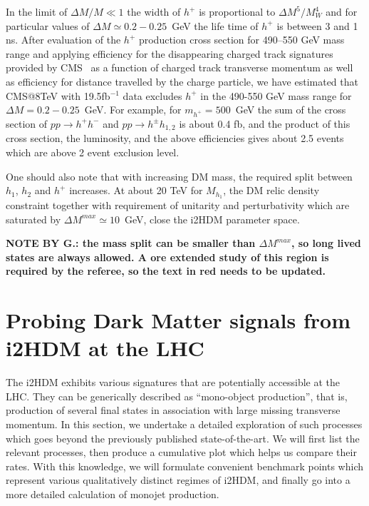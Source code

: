 \documentclass[12pt,a4paper]{article}
\newcommand {\red} {\color{red}}
\begin{document}
{\red In the limit of $\Delta M/M\ll 1$ the width of  $h^+$ is proportional to  $\Delta M^5/M_W^4$
and for particular values of $\Delta M\simeq 0.2-0.25$~GeV the  life time of  $h^+$ is between 3 and 1 ns.
After evaluation of the  $h^+$ production cross section for  490--550 GeV mass range
and applying efficiency for the  disappearing charged track signatures provided by  CMS~\cite{CMS:2014gxa}
as a function of charged track transverse momentum as well as efficiency for distance travelled by the charge particle,
we have estimated  that CMS@8TeV with 19.5fb$^{-1}$ data excludes  $h^+$  in the 490-550 GeV mass range for   $\Delta M=0.2-0.25$~GeV.
For example, for $m_{h^+}=500$~GeV the sum of the cross section of $pp\to{h^+}{h^-}$ and  $pp\to{h^\pm}{h_{1,2}}$
is about 0.4 fb, and the product of this cross section, the luminosity, and the above efficiencies gives about 2.5 events
which are above 2 event exclusion level.


One should also note that with increasing DM mass, the required split between $h_1$, $h_2$ and $h^+$
increases.
At about 20 TeV for $M_{h_1}$, the DM relic density constraint together with 
requirement of unitarity and perturbativity which are saturated by  $\Delta M^{max}\simeq 10$~GeV,
close the i2HDM parameter space.

{\bf NOTE BY G.: the mass split can be smaller than $\Delta M^{max}$, so long lived states are always allowed. A ore extended study of this region is required by the referee, so the text in red needs to be updated.}}



%
\section{Probing Dark Matter signals from i2HDM at the LHC}

 
The i2HDM exhibits various signatures that are potentially accessible at the LHC.
They can be generically described as ``mono-object production'', that is,
production of several final states in association with large missing transverse momentum.
In this section, we undertake a detailed exploration of such processes which goes 
beyond the previously published state-of-the-art.
We will first list the relevant processes, then produce a cumulative plot which
helps us compare their rates. 
With this knowledge, we will formulate convenient benchmark points which
represent various qualitatively distinct regimes of i2HDM, and finally go into a more detailed
calculation of monojet production.
\end{document}
